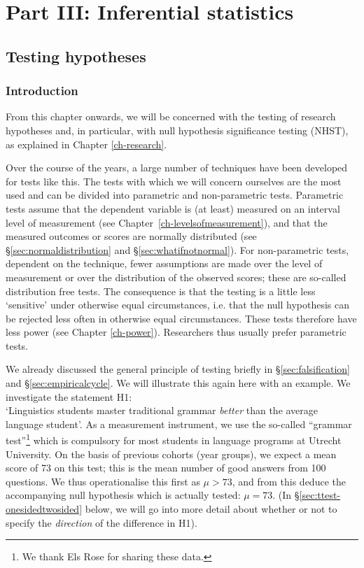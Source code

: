 \documentclass[
]{book}
\begin{document}
\hypertarget{part-part-iii-inferential-statistics}{%
\part*{Part III: Inferential statistics}\label{part-part-iii-inferential-statistics}}

\hypertarget{ch-testing}{%
\chapter{Testing hypotheses}\label{ch-testing}}

\hypertarget{sec:testing-introduction}{%
\section{Introduction}\label{sec:testing-introduction}}

From this chapter onwards, we will be concerned with the testing of
research hypotheses and, in particular, with null hypothesis significance testing (NHST),
as explained in Chapter \ref{ch-research}.

Over the course of the years, a large number of techniques have been developed
for tests like this. The tests with which we will concern ourselves
are the most used and can be divided into parametric
and non-parametric tests. Parametric tests assume that the dependent
variable is (at least) measured on an interval level of measurement (see
Chapter~\ref{ch-levelsofmeasurement}), and that the measured outcomes or
scores are normally distributed (see
§\ref{sec:normaldistribution} and §\ref{sec:whatifnotnormal}).
For non-parametric tests, dependent on the technique,
fewer assumptions are made over the level of measurement or over
the distribution of the observed scores; these are so-called
distribution free tests. The consequence is that the testing
is a little less `sensitive' under otherwise equal circumstances, i.e.
that the null hypothesis can be rejected less often in
otherwise equal circumstances. These tests therefore have less power (see
Chapter \ref{ch-power}). Researchers thus usually prefer parametric
tests.

We already discussed the general principle of testing briefly in
§\ref{sec:falsification} and §\ref{sec:empiricalcycle}.
We will illustrate this again here
with an example. We investigate the statement H1:\\
`Linguistics students master traditional grammar \emph{better} than the average language student'. As a measurement instrument, we use the so-called ``grammar test''\footnote{We thank Els Rose for sharing these data.} which is compulsory
for most students
in language programs at Utrecht University. On the basis of previous cohorts (year groups),
we expect a mean score of 73 on this test; this is the mean number of good answers
from 100 questions. We thus operationalise this first as \(\mu > 73\), and from this deduce
the accompanying null hypothesis which is actually tested:
\(\mu = 73\).
(In §\ref{sec:ttest-onesidedtwosided} below, we will go into more detail
about whether or not to specify the \emph{direction} of the difference in H1).
\end{document}
